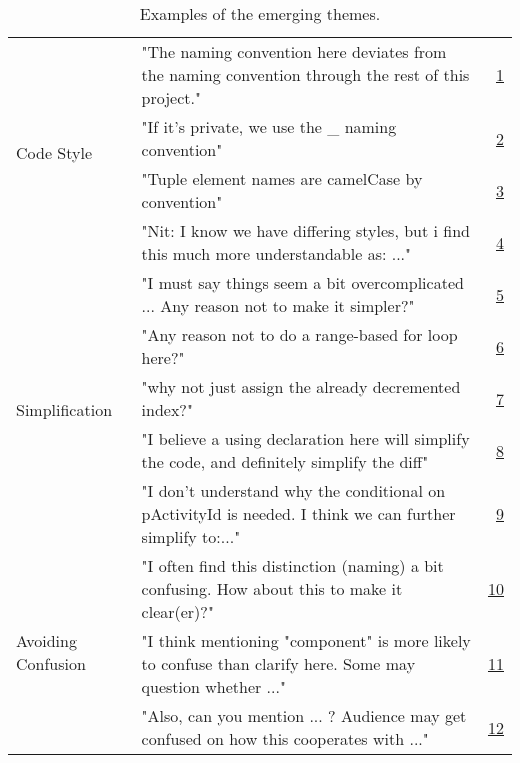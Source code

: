 \begin{table*}
  \caption{Examples of the emerging themes.}
  \label{tab:examples_themes}
  \begin{tabular}{llr}
    \toprule
\multirow{4}{*}{Code Style} &"The naming convention here deviates from the naming convention through the rest of this project."&\href{https://github.com/dotnet/roslyn/pull/39195\#discussion_r334107292}{1}\\
 &"If it's private, we use the \_ naming convention"&\href{https://github.com/dotnet/roslyn/pull/46474\#discussion_r468104286}{2}\\
 &"Tuple element names are camelCase by convention"&\href{https://github.com/dotnet/roslyn/pull/34027\#discussion_r270625885}{3}\\
 &"Nit: I know we have differing styles, but i find this much more understandable as: ..."&\href{https://github.com/dotnet/roslyn/pull/41982\#discussion_r388536309}{4}\\
 \hline
\multirow{5}{*}{Simplification} &"I must say things seem a bit overcomplicated ... Any reason not to make it simpler?"&\href{https://github.com/scrapy/scrapy/pull/4610\#discussion_r440006977}{5}\\
 &"Any reason not to do a range-based for loop here?"&\href{https://github.com/bitcoin/bitcoin/pull/17977\#discussion_r466999327}{6}\\
 &"why not just assign the already decremented index?"&\href{https://github.com/dotnet/coreclr/pull/27230\#discussion_r336624070}{7}\\
 &"I believe a using declaration here will simplify the code, and definitely simplify the diff"&\href{https://github.com/dotnet/roslyn/pull/37943\#discussion_r313441373}{8}\\
 &"I don't understand why the conditional on pActivityId is needed. I think we can further simplify to:..."&\href{https://github.com/dotnet/coreclr/pull/21817\#discussion_r245456406}{9}\\
 \hline
\multirow{4}{*}{Avoiding Confusion} &"I often find this distinction (naming) a bit confusing. How about this to make it clear(er)?"&\href{https://github.com/apache/flink/pull/11843\#discussion_r412368099}{10}\\
 &"I think mentioning "component" is more likely to confuse than clarify here. Some may question whether ..."&\href{https://github.com/apache/flink/pull/12057\#discussion_r424381099}{11}\\
 &"Also, can you mention ... ? Audience may get confused on how this cooperates with ..."&\href{https://github.com/apache/flink/pull/8785\#discussion_r295963941}{12}\\

\end{tabular}
\end{table*}
